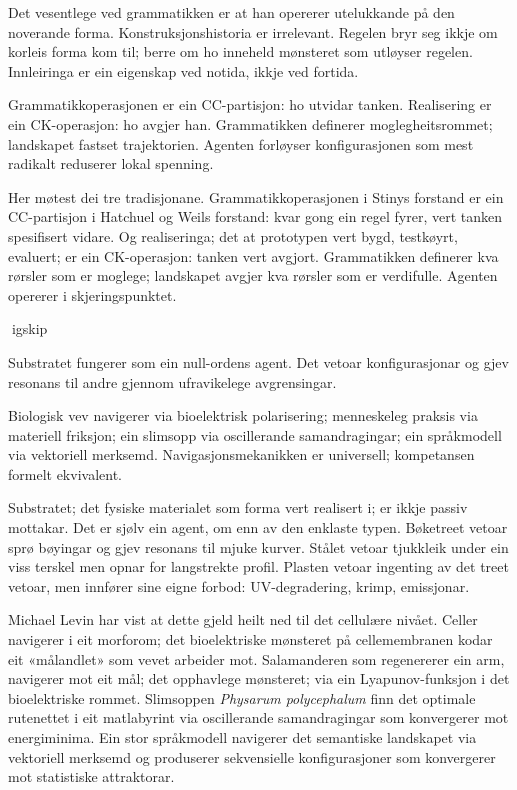 Det vesentlege ved grammatikken er at han opererer utelukkande på den noverande forma. Konstruksjonshistoria er irrelevant. Regelen bryr seg ikkje om korleis forma kom til; berre om ho inneheld mønsteret som utløyser regelen. Innleiringa er ein eigenskap ved notida, ikkje ved fortida.

Grammatikkoperasjonen er ein CC-partisjon: ho utvidar tanken. Realisering er ein CK-operasjon: ho avgjer han. Grammatikken definerer moglegheitsrommet; landskapet fastset trajektorien. Agenten forløyser konfigurasjonen som mest radikalt reduserer lokal spenning.

Her møtest dei tre tradisjonane. Grammatikkoperasjonen i Stinys forstand er ein CC-partisjon i Hatchuel og Weils forstand: kvar gong ein regel fyrer, vert tanken spesifisert vidare. Og realiseringa; det at prototypen vert bygd, testkøyrt, evaluert; er ein CK-operasjon: tanken vert avgjort. Grammatikken definerer kva rørsler som er moglege; landskapet avgjer kva rørsler som er verdifulle. Agenten opererer i skjeringspunktet.

igskip

Substratet fungerer som ein null-ordens agent. Det vetoar konfigurasjonar og gjev resonans til andre gjennom ufravikelege avgrensingar.

Biologisk vev navigerer via bioelektrisk polarisering; menneskeleg praksis via materiell friksjon; ein slimsopp via oscillerande samandragingar; ein språkmodell via vektoriell merksemd. Navigasjonsmekanikken er universell; kompetansen formelt ekvivalent.

Substratet; det fysiske materialet som forma vert realisert i; er ikkje passiv mottakar. Det er sjølv ein agent, om enn av den enklaste typen. Bøketreet vetoar sprø bøyingar og gjev resonans til mjuke kurver. Stålet vetoar tjukkleik under ein viss terskel men opnar for langstrekte profil. Plasten vetoar ingenting av det treet vetoar, men innfører sine eigne forbod: UV-degradering, krimp, emissjonar.

Michael Levin har vist at dette gjeld heilt ned til det cellulære nivået. Celler navigerer i eit morforom; det bioelektriske mønsteret på cellemembranen kodar eit «målandlet» som vevet arbeider mot. Salamanderen som regenererer ein arm, navigerer mot eit mål; det opphavlege mønsteret; via ein Lyapunov-funksjon i det bioelektriske rommet. Slimsoppen \textit{Physarum polycephalum} finn det optimale rutenettet i eit matlabyrint via oscillerande samandragingar som konvergerer mot energiminima. Ein stor språkmodell navigerer det semantiske landskapet via vektoriell merksemd og produserer sekvensielle konfigurasjoner som konvergerer mot statistiske attraktorar.

